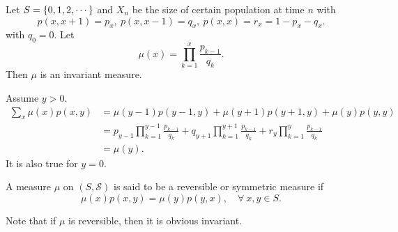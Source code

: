 \begin{exam}
    Let $S = \left\{0,1,2,\cdots\right\}$ and $X_n$ be the size of certain population at time $n$ with
    \begin{equation*}
        p(x,x+1) = p_x,~p(x,x-1) = q_x, ~p(x,x) = r_x = 1- p_x - q_x.
    \end{equation*}
    with $q_0 = 0$. Let 
    \begin{equation*}
        \mu(x) = \prod_{k=1}^{x} \frac{p_{k-1}}{q_k}.
    \end{equation*}
    Then $\mu$ is an invariant measure.

    \noindent Assume $y > 0$.
    \begin{equation*}
        \begin{aligned}
            \sum_x\mu(x)p(x,y) &= \mu(y-1)p(y-1,y) + \mu(y+1)p(y+1,y) + \mu(y)p(y,y) \\
            &= p_{y-1}\prod_{k=1}^{y-1} \frac{p_{k-1}}{q_k} + q_{y+1}\prod_{k=1}^{y+1} \frac{p_{k-1}}{q_k} + r_y\prod_{k=1}^{y} \frac{p_{k-1}}{q_k} \\
            &= \mu(y).
        \end{aligned}
    \end{equation*}
    It is also true for $y=0$.
\end{exam}


\begin{defn}
    A measure $\mu$ on $(S,\mathcal{S})$ is said to be a reversible or symmetric measure if
    \begin{equation*}
        \mu(x)p(x,y) = \mu(y)p(y,x),\quad \forall~x,y \in S.
    \end{equation*}
\end{defn}
\begin{rmk}
    Note that if $\mu$ is reversible, then it is obvious invariant.
\end{rmk}

